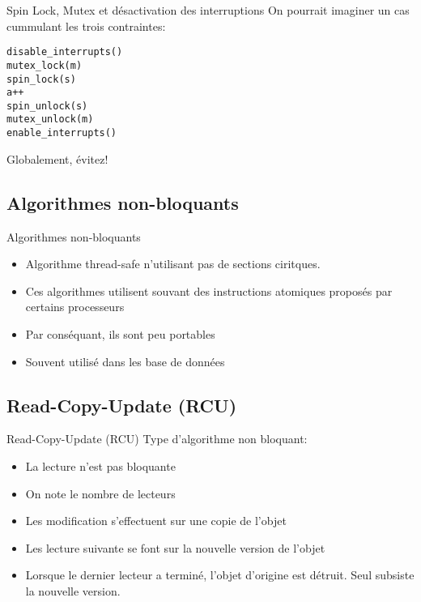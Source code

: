 \begin{frame}[fragile]{Spin Lock, Mutex et désactivation des interruptions}
  On pourrait imaginer un cas cummulant les trois contraintes:
  \begin{lstlisting} 
disable_interrupts()
mutex_lock(m)
spin_lock(s)
a++
spin_unlock(s)
mutex_unlock(m)
enable_interrupts()
  \end{lstlisting} 
  Globalement, évitez!
\end{frame} 

\subsection{Algorithmes non-bloquants}

\begin{frame}{Algorithmes non-bloquants}
  \begin{itemize} 
  \item Algorithme thread-safe n'utilisant pas de sections ciritques. 
  \item Ces  algorithmes utilisent souvant  des instructions atomiques
    proposés par certains processeurs
  \item Par conséquant, ils sont peu portables
  \item Souvent utilisé dans les base de données
  \end{itemize} 
\end{frame} 

\subsection{Read-Copy-Update (RCU)}

\begin{frame}{Read-Copy-Update (RCU)}
  Type d'algorithme non bloquant:
  \begin{itemize} 
  \item La lecture n'est pas bloquante
  \item On note le nombre de lecteurs
  \item Les modification s'effectuent sur une copie de l'objet
  \item Les lecture suivante se font sur la nouvelle version de l'objet
  \item Lorsque  le dernier lecteur  a terminé, l'objet  d'origine est
    détruit. Seul subsiste la nouvelle version.
  \end{itemize} 
\end{frame}

